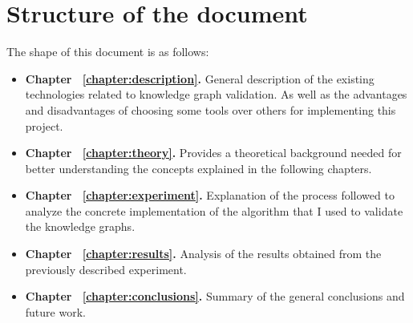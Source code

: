 \section{Structure of the document}

The shape of this document is as follows:

\begin{itemize}
    \item \textbf{Chapter ~\ref{chapter:description}.} General description of the existing technologies related to knowledge graph validation. As well as the advantages and disadvantages of choosing some tools over others for implementing this project.
    \item \textbf{Chapter ~\ref{chapter:theory}.} Provides a theoretical background needed for better understanding the concepts explained in the following chapters.
    \item \textbf{Chapter ~\ref{chapter:experiment}.} Explanation of the process followed to analyze the concrete implementation of the algorithm that I used to validate the knowledge graphs.
    \item \textbf{Chapter ~\ref{chapter:results}.} Analysis of the results obtained from the previously described experiment.
    \item \textbf{Chapter ~\ref{chapter:conclusions}.} Summary of the general conclusions and future work.
\end{itemize}